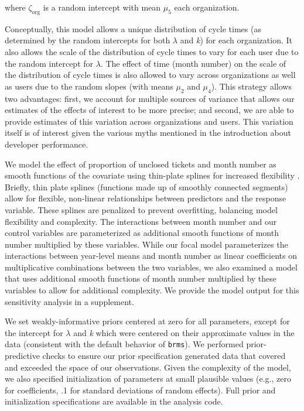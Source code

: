 \documentclass[
  sn-mathphys-ay,
]{sn-jnl}
\begin{document}
where \(\zeta_{\text{org}}\) is a random intercept with mean \(\mu_5\)
each organization.

Conceptually, this model allows a unique distribution of cycle times (as
determined by the random intercepts for both \(\lambda\) and \emph{k})
for each organization. It also allows the scale of the distribution of
cycle times to vary for each user due to the random intercept for
\(\lambda\). The effect of time (month number) on the scale of the
distribution of cycle times is also allowed to vary across organizations
as well as users due to the random slopes (with means \(\mu_2\) and
\(\mu_4\)). This strategy allows two advantages: first, we account for
multiple sources of variance that allows our estimates of the effects of
interest to be more precise; and second, we are able to provide
estimates of this variation across organizations and users. This
variation itself is of interest given the various myths mentioned in the
introduction about developer performance.

We model the effect of proportion of unclosed tickets and month number
as smooth functions of the covariate using thin-plate splines for
increased flexibility \citep{woodGeneralizedAdditiveModels2017}.
Briefly, thin plate splines (functions made up of smoothly connected
segments) allow for flexible, non-linear relationships between
predictors and the response variable. These splines are penalized to
prevent overfitting, balancing model flexibility and complexity. The
interactions between month number and our control variables are
parameterized as additional smooth functions of month number multiplied
by these variables. While our focal model parameterizes the interactions
between year-level means and month number as linear coefficients on
multiplicative combinations between the two variables, we also examined
a model that uses additional smooth functions of month number multiplied
by these variables to allow for additional complexity. We provide the
model output for this sensitivity analysis in a supplement.

We set weakly-informative priors centered at zero for all parameters,
except for the intercept for \(\lambda\) and \emph{k} which were
centered on their approximate values in the data (consistent with the
default behavior of \texttt{brms}). We performed prior-predictive checks
to ensure our prior specification generated data that covered and
exceeded the space of our observations. Given the complexity of the
model, we also specified initialization of parameters at small plausible
values (e.g., zero for coefficients, .1 for standard deviations of
random effects). Full prior and initialization specifications are
available in the analysis code.
\end{document}
